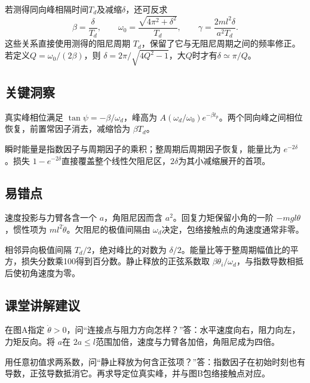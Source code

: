 \documentclass[UTF8,fontset=fandol,a4paper,11pt]{ctexart}
\begin{document}
若测得同向峰相隔时间$T_d$及减缩$\delta$，还可反求
\[
\beta=\frac\delta{T_d},\qquad
\omega_0=\frac{\sqrt{4\pi^2+\delta^2}}{T_d},\qquad
\gamma=\frac{2ml^2\delta}{a^2T_d}.
\]
这些关系直接使用测得的阻尼周期 $T_d$，保留了它与无阻尼周期之间的频率修正。
若定义$Q=\omega_0/(2\beta)$，则
$\delta=2\pi/\sqrt{4Q^2-1}$，大$Q$时才有$\delta\simeq\pi/Q$。




\subsection*{关键洞察}

真实峰相位满足 $\tan\psi=-\beta/\omega_d$，峰高为 $A(\omega_d/\omega_0)e^{-\beta t_p}$。两个同向峰之间相位恢复，前置常因子消去，减缩恰为 $\beta T_d$。

瞬时能量是指数因子与周期因子的乘积；整周期后周期因子恢复，能量比为 $e^{-2\delta}$。损失 $1-e^{-2\delta}$直接覆盖整个线性欠阻尼区，$2\delta$为其小减缩展开的首项。




\subsection*{易错点}

速度投影与力臂各含一个 $a$，角阻尼因而含 $a^2$。回复力矩保留小角的一阶 $-mgl\theta$，惯性项为 $ml^2\ddot\theta$。欠阻尼的极值间隔由 $\omega_d$决定，包络接触点的角速度通常非零。

相邻异向极值间隔 $T_d/2$，绝对峰比的对数为 $\delta/2$。能量比等于整周期幅值比的平方，损失分数乘100得到百分数。静止释放的正弦系数取 $\beta\theta_i/\omega_d$，与指数导数相抵后使初角速度为零。




\subsection*{课堂讲解建议}

在图A指定 $\dot\theta>0$，问“连接点与阻力方向怎样？”答：水平速度向右，阻力向左，力矩反向。将 $a$在 $2a\le l$范围加倍，速度与力臂各加倍，角阻尼成为四倍。

用任意初值求两系数，问“静止释放为何含正弦项？”答：指数因子在初始时刻也有导数，正弦导数抵消它。再求导定位真实峰，并与图B包络接触点对应。
\end{document}
